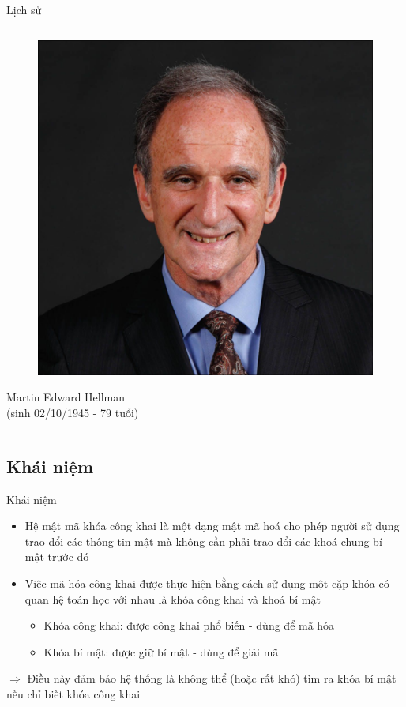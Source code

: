 \documentclass{beamer}
\begin{document}
\begin{frame}{Lịch sử}
\begin{columns}
\begin{column}{0.4\textwidth}
\begin{figure}[H]
\centering
\includegraphics[scale = 0.4]{pictures/Martin_Edward_Hellman.png}
\end{figure}
Martin Edward Hellman\\(sinh 02/10/1945 - 79 tuổi)
\end{column}

\end{columns}
\end{frame}
\subsection{Khái niệm}
\begin{frame}{Khái niệm}

\begin{itemize}
\item Hệ mật mã khóa công khai là một dạng mật mã hoá cho phép người sử dụng trao đổi các thông tin mật mà không cần phải trao đổi các khoá chung bí mật trước đó
\item Việc mã hóa công khai được thực hiện bằng cách sử dụng một cặp khóa có quan hệ toán học với nhau là khóa công khai và khoá bí mật
\begin{itemize}
\item Khóa công khai: được công khai phổ biến - dùng để mã hóa
\item Khóa bí mật: được giữ bí mật - dùng để giải mã
\end{itemize}
\end{itemize}

$\Rightarrow$ Điều này đảm bảo hệ thống là không thể (hoặc rất khó) tìm ra khóa bí mật nếu chỉ biết khóa công khai

\end{frame}
\end{document}
